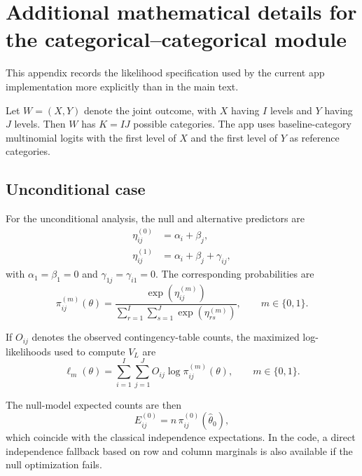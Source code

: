 \documentclass[preprint,12pt,a4paper]{elsarticle}
\numberwithin{equation}{section}
\begin{document}
\appendix

\section{Additional mathematical details for the categorical--categorical module}

This appendix records the likelihood specification used by the current app implementation more explicitly than in the main text.

Let $W=(X,Y)$ denote the joint outcome, with $X$ having $I$ levels and $Y$ having $J$ levels. Then $W$ has $K=IJ$ possible categories. The app uses baseline-category multinomial logits with the first level of $X$ and the first level of $Y$ as reference categories.

\subsection{Unconditional case}

For the unconditional analysis, the null and alternative predictors are
\begin{align}
\eta^{(0)}_{ij} &= \alpha_i + \beta_j,
\label{eq:app-uncond-null}
\\
\eta^{(1)}_{ij} &= \alpha_i + \beta_j + \gamma_{ij},
\label{eq:app-uncond-alt}
\end{align}
with $\alpha_1=\beta_1=0$ and $\gamma_{1j}=\gamma_{i1}=0$. The corresponding probabilities are
\begin{equation}
\pi^{(m)}_{ij}(\theta)=
\frac{\exp\!\left(\eta^{(m)}_{ij}\right)}
{\sum_{r=1}^{I}\sum_{s=1}^{J}\exp\!\left(\eta^{(m)}_{rs}\right)},
\qquad m\in\{0,1\}.
\label{eq:app-uncond-prob}
\end{equation}

If $O_{ij}$ denotes the observed contingency-table counts, the maximized log-likelihoods used to compute $V_L$ are
\begin{equation}
\ell_m(\theta)=
\sum_{i=1}^{I}\sum_{j=1}^{J}
O_{ij}\log \pi^{(m)}_{ij}(\theta),
\qquad m\in\{0,1\}.
\label{eq:app-uncond-loglik}
\end{equation}

The null-model expected counts are then
\begin{equation}
E^{(0)}_{ij}=n\,\pi^{(0)}_{ij}(\widehat{\theta}_0),
\label{eq:app-uncond-expected}
\end{equation}
which coincide with the classical independence expectations. In the code, a direct independence fallback based on row and column marginals is also available if the null optimization fails.
\end{document}
